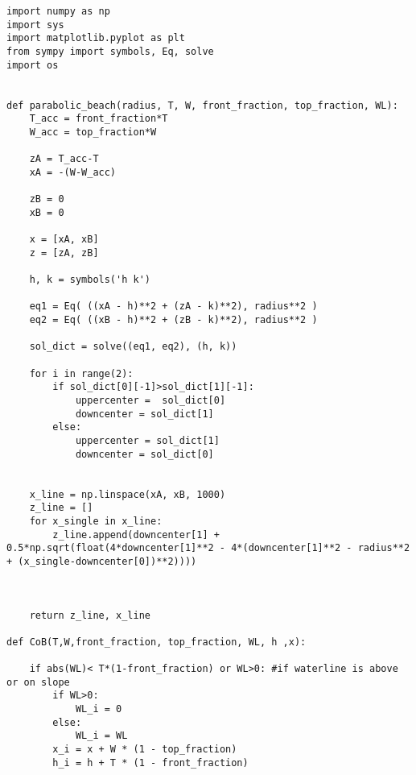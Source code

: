 \begin{mdframed}[backgroundcolor=light-gray, roundcorner=10pt,leftmargin=1, rightmargin=1, innerleftmargin=0, innertopmargin=7,innerbottommargin=0, outerlinewidth=1, linecolor=light-gray]
\begin{lstlisting}[linewidth=\columnwidth,caption=Functions used in setting up simulations ., label=script:setting up simulations]
import numpy as np
import sys
import matplotlib.pyplot as plt
from sympy import symbols, Eq, solve
import os


def parabolic_beach(radius, T, W, front_fraction, top_fraction, WL):
    T_acc = front_fraction*T
    W_acc = top_fraction*W

    zA = T_acc-T
    xA = -(W-W_acc)

    zB = 0
    xB = 0

    x = [xA, xB]
    z = [zA, zB]

    h, k = symbols('h k')

    eq1 = Eq( ((xA - h)**2 + (zA - k)**2), radius**2 )
    eq2 = Eq( ((xB - h)**2 + (zB - k)**2), radius**2 )

    sol_dict = solve((eq1, eq2), (h, k))

    for i in range(2):
        if sol_dict[0][-1]>sol_dict[1][-1]:
            uppercenter =  sol_dict[0]
            downcenter = sol_dict[1]
        else:
            uppercenter = sol_dict[1]
            downcenter = sol_dict[0]


    x_line = np.linspace(xA, xB, 1000)
    z_line = []
    for x_single in x_line:
        z_line.append(downcenter[1] + 0.5*np.sqrt(float(4*downcenter[1]**2 - 4*(downcenter[1]**2 - radius**2 + (x_single-downcenter[0])**2))))



    return z_line, x_line

def CoB(T,W,front_fraction, top_fraction, WL, h ,x):

    if abs(WL)< T*(1-front_fraction) or WL>0: #if waterline is above or on slope
        if WL>0:
            WL_i = 0
        else:
            WL_i = WL
        x_i = x + W * (1 - top_fraction)
        h_i = h + T * (1 - front_fraction)


\end{lstlisting}
\end{mdframed}
